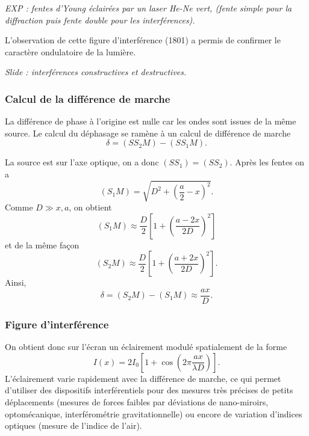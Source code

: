 \emph{EXP : fentes d'Young éclairées par un laser He-Ne vert, (fente simple pour la diffraction puis fente double pour les interférences).}

L'observation de cette figure d'interférence (1801) a permis de confirmer le caractère ondulatoire de la lumière.

\emph{Slide : interférences constructives et destructives.}

\subsubsection{Calcul de la différence de marche}

La différence de phase à l'origine est nulle car les ondes sont issues de la même source.
Le calcul du déphasage se ramène à un calcul de différence de marche
\begin{equation}
\delta = (SS_2M)-(SS_1M).
\end{equation}

La source est sur l'axe optique, on a donc $(SS_1) = (SS_2)$.
Après les fentes on a 
\begin{equation}
(S_1M) = \sqrt{D^2 + \left(\frac{a}{2} - x\right)^2}.
\end{equation}
Comme $D \gg x, a$, on obtient
\begin{equation}
(S_1M)\approx\frac{D}{2}\left[1+\left(\frac{a-2x}{2D}\right)^2\right]
\end{equation}
et de la même façon
\begin{equation}
(S_2M) \approx \frac{D}{2}\left[1+\left(\frac{a+2x}{2D}\right)^2\right].
\end{equation}
Ainsi,
\begin{equation}
\delta = (S_2M) - (S_1M) \approx \frac{ax}{D}.
\end{equation}

\subsubsection{Figure d'interférence}

On obtient donc sur l'écran un éclairement modulé spatialement de la forme
\begin{equation}
I(x) = 2I_0 \left[1+\cos\left(2\pi\frac{ax}{\lambda D}\right) \right].
\end{equation}
L'éclairement varie rapidement avec la différence de marche, ce qui permet d'utiliser des dispositifs interférentiels pour des mesures très précises de petits déplacements (mesures de forces faibles par déviations de nano-miroirs, optomécanique, interférométrie gravitationnelle) ou encore de variation d'indices optiques (mesure de l'indice de l'air).

